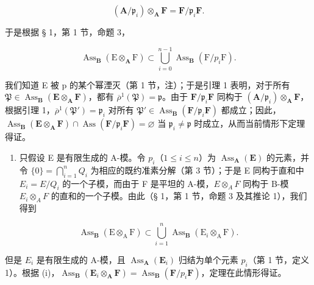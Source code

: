 \[
(\mathbf {A} / \mathfrak {p} _ {i}) \otimes_ {\mathbf {A}} \mathbf {F} = \mathbf {F} / \mathfrak {p} _ {i} \mathbf {F}.
\]

于是根据 § 1，第 1 节，命题 3，

\[
\operatorname{Ass} _ {\mathbf {B}} (\mathrm{E} \otimes_ {\mathbf {A}} \mathrm{F}) \subset \bigcup_ {i = 0} ^ {n - 1} \operatorname{Ass} _ {\mathbf {B}} (\mathrm{F} / p _ {i} \mathrm{F}).
\]

  我们知道 E 被 p 的某个幂湮灭（第 1 节，注）；于是引理 1 表明，对于所有 \(\mathfrak{P} \in \operatorname{Ass}_{\mathbf{B}}(\mathbf{E} \otimes_{\mathbf{A}} \mathbf{F})\)，都有 \(\overline{\rho}^{1}(\mathfrak{P}) = \mathfrak{p}\)。由于 \(\mathbf{F} / \mathfrak{p}_i \mathbf{F}\) 同构于 \((\mathbf{A} / \mathfrak{p}_i) \otimes_{\mathbf{A}} \mathbf{F}\)，根据引理 1，\(\overline{\rho}^{1}(\mathfrak{P}') = \mathfrak{p}_i\) 对所有 \(\mathfrak{P}' \in \operatorname{Ass}_{\mathbf{B}}(\mathbf{F} / \mathfrak{p}_i \mathbf{F})\) 都成立；因此，\(\operatorname{Ass}_{\mathbf{B}}(\mathbf{E} \otimes_{\mathbf{A}} \mathbf{F}) \cap \operatorname{Ass}(\mathbf{F} / \mathfrak{p}_i \mathbf{F}) = \varnothing\) 当 \(\mathfrak{p}_i \neq \mathfrak{p}\) 时成立，从而当前情形下定理得证。

\begin{enumerate}
\def\labelenumi{(\roman{enumi})}
\setcounter{enumi}{1}
\tightlist
\item
  只假设 E 是有限生成的 A-模。令 \(p_{i}\)（\(1 \leqslant i \leqslant n\)）为 \(\operatorname{Ass}_{\mathbf{A}}(\mathbf{E})\) 的元素，并令 \(\{0\} = \bigcap_{i=1}^{n} Q_{i}\) 为相应的既约准素分解（第 3 节）；于是 E 同构于直和中 \(E_{i} = E/Q_{i}\) 的一个子模，而由于 F 是平坦的 A-模，\(E \otimes_{A} F\) 同构于 B-模 \(E_{i} \otimes_{A} F\) 的直和的一个子模。由此（§ 1，第 1 节，命题 3 及其推论 1），我们得到
\end{enumerate}

\[
\operatorname{Ass} _ {\mathbf {B}} (\mathrm{E} \otimes_ {\mathrm{A}} \mathrm{F}) \subset \bigcup_ {i = 1} ^ {n} \operatorname{Ass} _ {\mathbf {B}} (\mathrm{E} _ {i} \otimes_ {\mathrm{A}} \mathrm{F}).
\]

但是 \(E_{i}\) 是有限生成的 A-模，且 \(\operatorname{Ass}_{\mathbf{A}}(\mathbf{E}_{i})\) 归结为单个元素 \(p_{i}\)（第 1 节，定义 1）。根据 (i)，\(\operatorname{Ass}_{\mathbf{B}}(\mathbf{E}_{i} \otimes_{\mathbf{A}} \mathbf{F}) = \operatorname{Ass}_{\mathbf{B}}(\mathbf{F}/p_{i}\mathbf{F})\)，定理在此情形得证。

